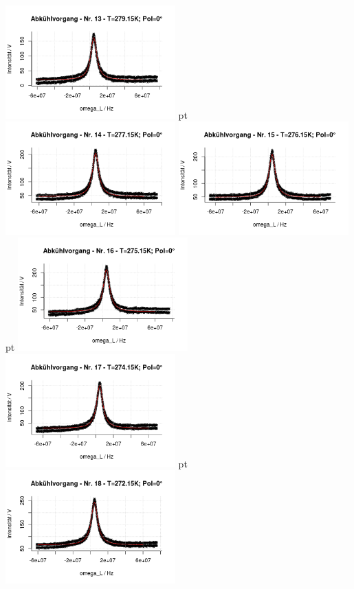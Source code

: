 \documentclass[12pt]{article}
\begin{document}
\begin{minipage}[h!]{\textwidth}
	\centering
		\includegraphics[width=0.49\textwidth]{figures/cold0-13.png} pt
		\includegraphics[width=0.49\textwidth]{figures/cold0-14.png}\vskip -10pt	\includegraphics[width=0.49\textwidth]{figures/cold0-15.png} pt
		\includegraphics[width=0.49\textwidth]{figures/cold0-16.png}\vskip -10pt
		\includegraphics[width=0.49\textwidth]{figures/cold0-17.png} pt	\includegraphics[width=0.49\textwidth]{figures/cold0-18.png}\vskip -10pt
	\end{minipage}
\end{document}
